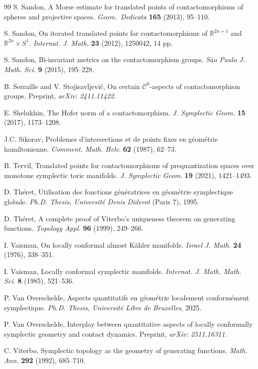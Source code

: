 \documentclass{amsart}
\theoremstyle{remark}
\begin{document}
\begin{thebibliography}{99}
 S. Sandon, A Morse estimate for translated points of contactomorphisms of spheres and projective spaces. \textit{Geom.\ Dedicata} \textbf{165} (2013), 95--110.

 S. Sandon, On iterated translated points for contactomorphisms of $\mathbb{R}^{2n+1}$ and $\mathbb{R}^{2n} \times S^1$. \textit{Internat. J. Math.} \textbf{23} (2012), 1250042, 14 pp.

 S. Sandon, Bi-invariant metrics on the contactomorphism groups. \textit{S\~{a}o Paulo J. Math. Sci.} \textbf{9} (2015), 195--228.

 B. Serraille and V. Stojisavljevi\'c, On certain $\mathcal{C}^0$-aspects of contactomorphism groups. Preprint, \textit{arXiv: 2411.11422}.

 E. Shelukhin, The Hofer norm of a contactomorphism. \textit{J. Symplectic Geom.} \textbf{15} (2017), 1173--1208.

 J.C. Sikorav, Problemes d’intersections et de points fixes en g\'eom\'etrie hamiltonienne. \textit{Comment. Math. Helv}. \textbf{62} (1987), 62–73.

 B. Tervil, Translated points for contactomorphisms of prequantization spaces over monotone symplectic toric manifolds. \textit{J. Symplectic Geom}. \textbf{19} (2021), 1421--1493.

 D. Th\'eret, Utilisation des fonctions g\'en\'eratrices en g\'eom\'etrie symplectique globale. \textit{Ph.D. Thesis, Universit\'e Denis Diderot} (Paris 7), 1995.

 D. Th\'eret, A complete proof of Viterbo's uniqueness theorem on generating functions. \textit{Topology Appl.} \textbf{96} (1999), 249--266. 

 I. Vaisman, On locally conformal almost K\"ahler manifolds. \textit{Israel J. Math.} \textbf{24} (1976), 338--351.

 I. Vaisman, Locally conformal symplectic manifolds. \textit{Internat. J. Math. Math. Sci.} \textbf{8} (1985), 521--536.

  P. Van Overschelde, Aspects quantitatifs en g\'eom\'etrie localement conform\'ement symplectique. \textit{Ph.D. Thesis, Universit\'e Libre de Bruxelles}, 2025.

 P. Van Overschelde, Interplay between quantitative aspects of locally conformally symplectic geometry and contact dynamics. Preprint, \textit{arXiv: 2511.16311}.

 C. Viterbo, Symplectic topology as the geometry of generating functions. \textit{Math. Ann.} \textbf{292} (1992), 685--710.

\end{thebibliography}





\end{document}
